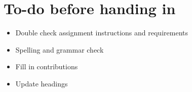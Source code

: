\section*{To-do before handing in}

\begin{itemize}
    \item Double check assignment instructions and requirements
    \item Spelling and grammar check
    \item Fill in contributions
    \item Update headings
\end{itemize}